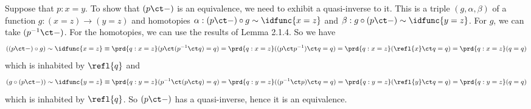  \soln
Suppose that $p : x = y$.  To show that $(p \ct -)$ is an equivalence, we need
to exhibit a quasi-inverse to it.  This is a triple $(g, \alpha, \beta)$ of a
function $g:(x = z) \to (y = z)$ and homotopies $\alpha : (p \ct -) \circ g \sim
\idfunc{x=z}$ and $\beta : g \circ (p \ct -) \sim \idfunc{y=z}$.  For $g$, we
can take $(p^{-1} \ct -)$.  For the homotopies, we can use the results of Lemma
2.1.4.  So we have
\[
((p \ct -) \circ g) \sim \idfunc{x=z}
\equiv
\prd{q:x=z}(p \ct (p^{-1} \ct q) = q)
=
\prd{q:x=z}((p \ct p^{-1}) \ct q = q)
=
\prd{q:x=z}(\refl{x} \ct q = q)
=
\prd{q:x=z}(q = q)
\]
which is inhabited by $\refl{q}$ and
\[
(g \circ (p \ct -)) \sim \idfunc{y=z}
\equiv
\prd{q:y=z}(p^{-1} \ct (p \ct q) = q)
=
\prd{q:y=z}((p^{-1} \ct p) \ct q = q)
=
\prd{q:y=z}(\refl{y} \ct q = q)
=
\prd{q:y=z}(q = q)
\]
which is inhabited by $\refl{q}$.  So $(p \ct -)$ has a quasi-inverse, hence it
is an equivalence.
